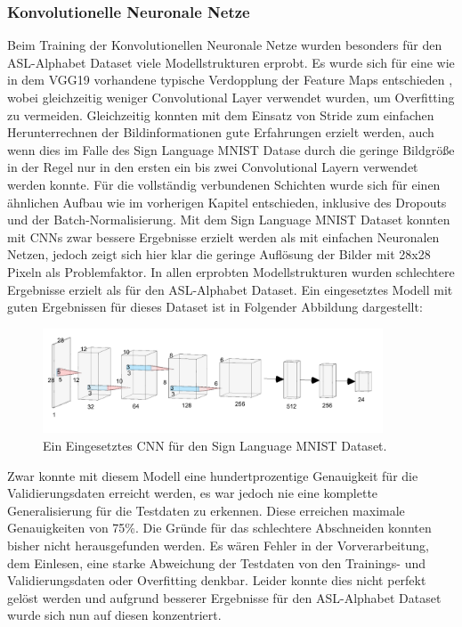 \documentclass[11pt,bibliography=totocnumbered]{scrartcl}
\begin{document}
\subsubsection{Konvolutionelle Neuronale Netze}
Beim Training der Konvolutionellen Neuronale Netze wurden besonders für den ASL-Alphabet Dataset viele Modellstrukturen erprobt. Es wurde sich für eine wie in dem VGG19 vorhandene typische Verdopplung der Feature Maps entschieden \cite{VGG19}, wobei gleichzeitig weniger Convolutional Layer verwendet wurden, um Overfitting zu vermeiden. Gleichzeitig konnten mit dem Einsatz von Stride zum einfachen Herunterrechnen der Bildinformationen gute Erfahrungen erzielt werden, auch wenn dies im Falle des Sign Language MNIST Datase durch die geringe Bildgröße in der Regel nur in den ersten ein bis zwei Convolutional Layern verwendet werden konnte. Für die vollständig verbundenen Schichten wurde sich für einen ähnlichen Aufbau wie im vorherigen Kapitel entschieden, inklusive des Dropouts und der Batch-Normalisierung. Mit dem Sign Language MNIST Dataset konnten mit CNNs zwar bessere Ergebnisse erzielt werden als mit einfachen Neuronalen Netzen, jedoch zeigt sich hier klar die geringe Auflösung der Bilder mit 28x28 Pixeln als Problemfaktor. In allen erprobten Modellstrukturen wurden schlechtere Ergebnisse erzielt als für den ASL-Alphabet Dataset. Ein eingesetztes Modell mit guten Ergebnissen für dieses Dataset ist in Folgender Abbildung dargestellt:
\begin{figure}[H]
	\centering
	\includegraphics[width=0.90\textwidth]{cnn_example_kaggle_1}
	\vspace*{-3mm}
	\caption[Eingesetztes CNN für den Sign Language MNIST Dataset]{Ein Eingesetztes CNN für den Sign Language MNIST Dataset.}
	\label{fig:cnn_example_kaggle_1}
\end{figure}
\vspace*{-5mm}
Zwar konnte mit diesem Modell eine hundertprozentige Genauigkeit für die Validierungsdaten erreicht werden, es war jedoch nie eine komplette Generalisierung für die Testdaten zu erkennen. Diese erreichen maximale Genauigkeiten von 75\%. Die Gründe für das schlechtere Abschneiden konnten bisher nicht herausgefunden werden. Es wären Fehler in der Vorverarbeitung, dem Einlesen, eine starke Abweichung der Testdaten von den Trainings- und Validierungsdaten oder Overfitting denkbar. Leider konnte dies nicht perfekt gelöst werden und aufgrund besserer Ergebnisse für den ASL-Alphabet Dataset wurde sich nun auf diesen konzentriert. 
\end{document}
